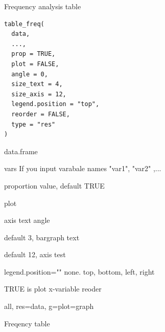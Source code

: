 \documentclass[a4paper]{book}
\begin{document}
%
\begin{Description}
Frequency analysis table
\end{Description}
%
\begin{Usage}
\begin{verbatim}
table_freq(
  data,
  ...,
  prop = TRUE,
  plot = FALSE,
  angle = 0,
  size_text = 4,
  size_axis = 12,
  legend.position = "top",
  reorder = FALSE,
  type = "res"
)
\end{verbatim}
\end{Usage}
%
\begin{Arguments}
\begin{ldescription}
\item[\code{data}] data.frame

\item[\code{...}] vars If you input varabale names "var1", "var2" ,...

\item[\code{prop}] proportion value, default TRUE

\item[\code{plot}] plot

\item[\code{angle}] axis text angle

\item[\code{size\_text}] default 3, bargraph text

\item[\code{size\_axis}] default 12, axis test

\item[\code{legend.position}] legend.position="" none. top, bottom, left, right

\item[\code{reorder}] TRUE is plot x-variable reoder

\item[\code{type}] all, res=data, g=plot=graph
\end{ldescription}
\end{Arguments}
%
\begin{Value}
Freqency table
\end{Value}
%
\end{document}
